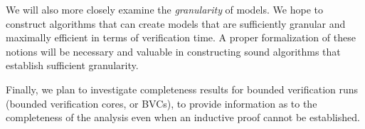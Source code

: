 We will also more closely examine the {\em granularity} of models.  We hope to construct algorithms that can create models that are sufficiently granular and maximally efficient in terms of verification time.  A proper formalization of these notions will be necessary and valuable in constructing sound algorithms that establish sufficient granularity.

Finally, we plan to investigate completeness results for bounded verification runs (bounded verification cores, or BVCs), to provide information as to the completeness of the analysis even when an inductive proof cannot be established.
\clearpage

